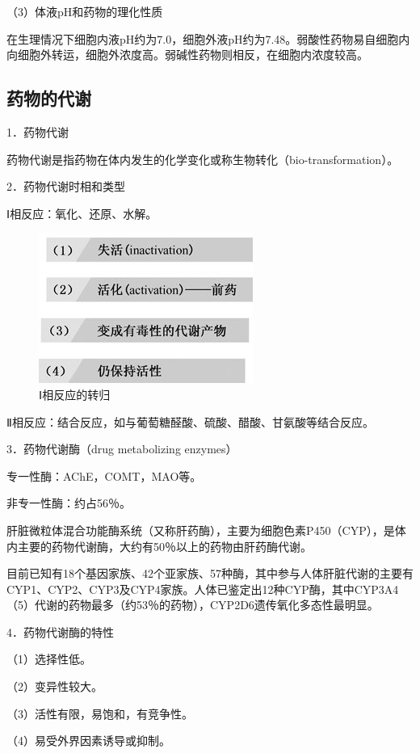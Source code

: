 （3）体液pH和药物的理化性质

在生理情况下细胞内液pH约为7.0，细胞外液pH约为7.48。弱酸性药物易自细胞内向细胞外转运，细胞外浓度高。弱碱性药物则相反，在细胞内浓度较高。

\subsection{药物的代谢}

1．药物代谢

药物代谢是指药物在体内发生的化学变化或称生物转化（bio-transformation）。

2．药物代谢时相和类型

Ⅰ相反应：氧化、还原、水解。

\begin{figure}[!htbp]
 \centering
 \includegraphics{./images/Image00037.jpg}
 \captionsetup{justification=centering}
 \caption{Ⅰ相反应的转归}
 \label{fig3-10}
  \end{figure} 

Ⅱ相反应：结合反应，如与葡萄糖醛酸、硫酸、醋酸、甘氨酸等结合反应。

3．药物代谢酶（drug metabolizing enzymes）

专一性酶：AChE，COMT，MAO等。

非专一性酶：约占56％。

肝脏微粒体混合功能酶系统（又称肝药酶），主要为细胞色素P450（CYP），是体内主要的药物代谢酶，大约有50％以上的药物由肝药酶代谢。

目前已知有18个基因家族、42个亚家族、57种酶，其中参与人体肝脏代谢的主要有CYP1、CYP2、CYP3及CYP4家族。人体已鉴定出12种CYP酶，其中CYP3A4（5）代谢的药物最多（约53％的药物），CYP2D6遗传氧化多态性最明显。

4．药物代谢酶的特性

（1）选择性低。

（2）变异性较大。

（3）活性有限，易饱和，有竞争性。

（4）易受外界因素诱导或抑制。

